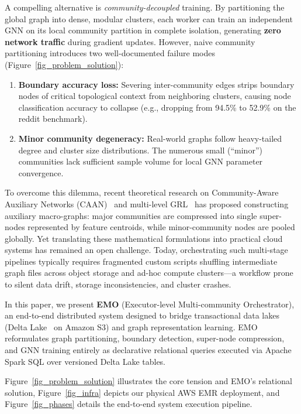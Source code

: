 \documentclass[conference,compsoc]{IEEEtran}
\begin{document}
A compelling alternative is \emph{community-decoupled} training. By partitioning the global graph into dense, modular clusters, each worker can train an independent GNN on its local community partition in complete isolation, generating \textbf{zero network traffic} during gradient updates. However, naive community partitioning introduces two well-documented failure modes (Figure~\ref{fig_problem_solution}):
\begin{enumerate}
    \item \textbf{Boundary accuracy loss:} Severing inter-community edges strips boundary nodes of critical topological context from neighboring clusters, causing node classification accuracy to collapse (e.g., dropping from 94.5\% to 52.9\% on the reddit benchmark).
    \item \textbf{Minor community degeneracy:} Real-world graphs follow heavy-tailed degree and cluster size distributions. The numerous small (``minor'') communities lack sufficient sample volume for local GNN parameter convergence.
\end{enumerate}

To overcome this dilemma, recent theoretical research on Community-Aware Auxiliary Networks (CAAN)~\cite{caan2024} and multi-level GRL~\cite{saan2024,mlgrl2025} has proposed constructing auxiliary macro-graphs: major communities are compressed into single super-nodes represented by feature centroids, while minor-community nodes are pooled globally. Yet translating these mathematical formulations into practical cloud systems has remained an open challenge. Today, orchestrating such multi-stage pipelines typically requires fragmented custom scripts shuffling intermediate graph files across object storage and ad-hoc compute clusters---a workflow prone to silent data drift, storage inconsistencies, and cluster crashes.

In this paper, we present \textbf{EMO} (Executor-level Multi-community Orchestrator), an end-to-end distributed system designed to bridge transactional data lakes (Delta Lake~\cite{armbrust2020deltalake} on Amazon S3) and graph representation learning. EMO reformulates graph partitioning, boundary detection, super-node compression, and GNN training entirely as declarative relational queries executed via Apache Spark SQL over versioned Delta Lake tables. 

Figure~\ref{fig_problem_solution} illustrates the core tension and EMO's relational solution, Figure~\ref{fig_infra} depicts our physical AWS EMR deployment, and Figure~\ref{fig_phases} details the end-to-end system execution pipeline.
\end{document}
